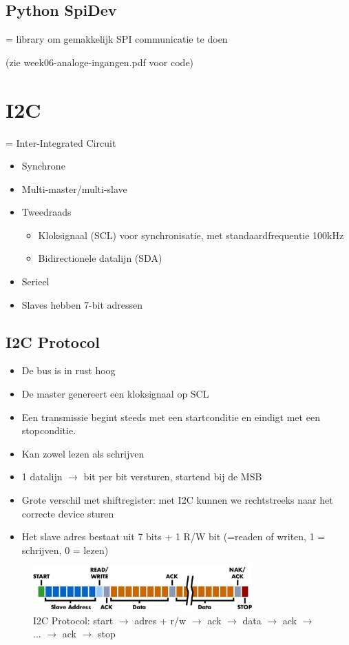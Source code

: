 \documentclass{article}
\begin{document}
\subsection{Python SpiDev}
= library om gemakkelijk SPI communicatie te doen

(zie week06-analoge-ingangen.pdf voor code)

\section{I2C}
= Inter-Integrated Circuit

\begin{itemize}
    \item Synchrone
    \item Multi-master/multi-slave 
    \item Tweedraads
    \begin{itemize}
        \item Kloksignaal (SCL) voor synchronisatie, met standaardfrequentie 100kHz
        \item Bidirectionele datalijn (SDA)
    \end{itemize}
    \item Serieel
    \item Slaves hebben 7-bit adressen
\end{itemize}

\subsection{I2C Protocol}
\begin{itemize}
    \item De bus is in rust hoog
    \item De master genereert een kloksignaal op SCL
    \item Een transmissie begint steeds met een startconditie en eindigt met een stopconditie.
    \item Kan zowel lezen als schrijven
    \item 1 datalijn $\rightarrow$ bit per bit versturen, startend bij de MSB
    \item Grote verschil met shiftregister: met I2C kunnen we rechtstreeks naar het correcte device sturen
    \item Het slave adres bestaat uit 7 bits + 1 R/W bit (=readen of writen, 1 = schrijven, 0 = lezen)
\end{itemize}

\begin{figure}[H]
    \centering
    \includegraphics[width=0.75\textwidth]{i2c-protocol.png}
    \caption{I2C Protocol: start $\rightarrow$ adres + r/w $\rightarrow$ ack $\rightarrow$ data $\rightarrow$ ack $\rightarrow$ ... $\rightarrow$ ack $\rightarrow$ stop}
\end{figure}
\end{document}

